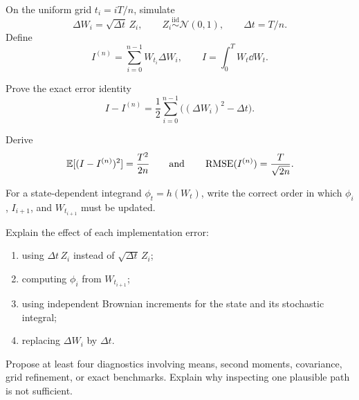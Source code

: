 \begin{exercise}
On the uniform grid \(t_i=iT/n\), simulate
\[
\Delta W_i=\sqrt{\Delta t}\,Z_i,
\qquad
Z_i\overset{\mathrm{iid}}{\sim}\mathcal N(0,1),
\qquad
\Delta t=T/n.
\]
Define
\[
I^{(n)}=\sum_{i=0}^{n-1}W_{t_i}\Delta W_i,
\qquad
I=\int_0^TW_t\dd W_t.
\]
\begin{exparts}
  \item Prove the exact error identity
  \[
  I-I^{(n)}
  =\frac12\sum_{i=0}^{n-1}\bigl((\Delta W_i)^2-\Delta t\bigr).
  \]
  \item Derive
  \[
  \mathbb{E}[(I-I^{(n)})^2]=\frac{T^2}{2n}
  \qquad\text{and}\qquad
  \operatorname{RMSE}(I^{(n)})=\frac{T}{\sqrt{2n}}.
  \]
  \item For a state-dependent integrand \(\phi_t=h(W_t)\), write the correct
  order in which \(\phi_i\), \(I_{i+1}\), and \(W_{t_{i+1}}\) must be
  updated.
  \item Explain the effect of each implementation error:
  \begin{enumerate}[label=(\roman*),leftmargin=2.4em,itemsep=0.1em]
    \item using \(\Delta t\,Z_i\) instead of \(\sqrt{\Delta t}\,Z_i\);
    \item computing \(\phi_i\) from \(W_{t_{i+1}}\);
    \item using independent Brownian increments for the state and its
    stochastic integral;
    \item replacing \(\Delta W_i\) by \(\Delta t\).
  \end{enumerate}
  \item Propose at least four diagnostics involving means, second moments,
  covariance, grid refinement, or exact benchmarks. Explain why inspecting one
  plausible path is not sufficient.
\end{exparts}
\end{exercise}
